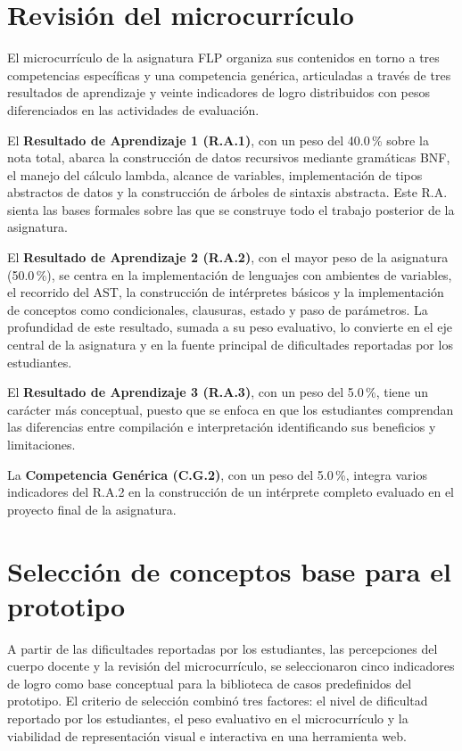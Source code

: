 \section{Revisión del microcurrículo}
El microcurrículo de la asignatura FLP organiza sus contenidos en torno a tres competencias específicas y una competencia genérica, articuladas a través de tres resultados de aprendizaje y veinte indicadores de logro distribuidos con pesos diferenciados en las actividades de evaluación.

El \textbf{Resultado de Aprendizaje 1 (R.A.1)}, con un peso del {40.0\,\%} sobre la nota total, abarca la construcción de datos recursivos mediante gramáticas BNF, el manejo del cálculo lambda, alcance de variables, implementación de tipos abstractos de datos y la construcción de árboles de sintaxis abstracta. Este R.A. sienta las bases formales sobre las que se construye todo el trabajo posterior de la asignatura.

El \textbf{Resultado de Aprendizaje 2 (R.A.2)}, con el mayor peso de la asignatura ({50.0\,\%}), se centra en la implementación de lenguajes con ambientes de variables, el recorrido del AST, la construcción de intérpretes básicos y la implementación de conceptos como condicionales, clausuras, estado y paso de parámetros. La profundidad de este resultado, sumada a su peso evaluativo, lo convierte en el eje central de la asignatura y en la fuente principal de dificultades reportadas por los estudiantes.

El \textbf{Resultado de Aprendizaje 3 (R.A.3)}, con un peso del {5.0\,\%}, tiene un carácter más conceptual, puesto que se enfoca en que los estudiantes comprendan las diferencias entre compilación e interpretación identificando sus beneficios y limitaciones.

La \textbf{Competencia Genérica (C.G.2)}, con un peso del {5.0\,\%}, integra varios indicadores del R.A.2 en la construcción de un intérprete completo evaluado en el proyecto final de la asignatura.

\section{Selección de conceptos base para el prototipo}

A partir de las dificultades reportadas por los estudiantes, las percepciones del cuerpo docente y la revisión del microcurrículo, se seleccionaron cinco indicadores de logro como base conceptual para la biblioteca de casos predefinidos del prototipo. El criterio de selección combinó tres factores: el nivel de dificultad reportado por los estudiantes, el peso evaluativo en el microcurrículo y la viabilidad de representación visual e interactiva en una herramienta web.

